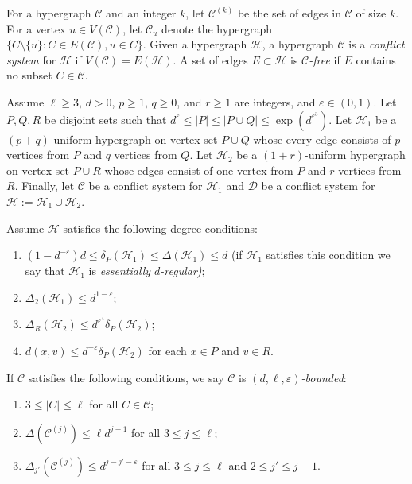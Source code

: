 \documentclass{article}
\theoremstyle{definition}
\newcommand\cH{{\mathcal H}}
\newcommand\cC{{\mathcal C}}
\newcommand{\cD}{\mathcal{D}}
\begin{document}
For a hypergraph $\cC$ and an integer $k$, let $\cC^{(k)}$ be the set of edges in $\cC$ of size $k$.  For a vertex $u \in V(\cC)$, let $\cC_u$ denote the hypergraph $\{C \setminus \{u\} \colon C \in E(\cC), u \in C\}$.  Given a hypergraph $\cH$, a hypergraph $\cC$ is a \emph{conflict system} for $\cH$ if $V(\cC) = E(\cH)$.  A set of edges $E \subset \cH$ is \emph{$\cC$-free} if $E$ contains no subset $C \in \cC$.
 

Assume $\ell \geq 3$, $d > 0$, $p\ge 1$, $q\ge 0$, and $r \geq 1$ are integers, and $\varepsilon \in (0,1)$.  Let $P, Q, R$ be disjoint sets such that $d^\varepsilon \leq |P| \leq |P \cup Q| \leq \exp(d^{\varepsilon^3})$.  Let $\cH_1$ be a $(p+q)$-uniform hypergraph  on vertex set $P\cup Q$ whose every edge consists of $p$ vertices from $P$ and $q$ vertices from $Q$. Let $\cH_2$ be a $(1+r)$-uniform hypergraph on vertex set $P\cup R$ whose edges consist of one vertex from $P$ and $r$ vertices from $R$.  Finally, let $\cC$ be a conflict system for $\cH_1$ and $\cD$ be a conflict system for $\cH := \cH_1 \cup \cH_2$.  

Assume $\cH$ satisfies the following degree conditions:
\begin{enumerate}[label=(H\arabic*)]
    \item \label{H1} $(1 - d^{-\varepsilon}) d \leq \delta_P(\cH_1) \leq \Delta(\cH_1) \leq d$ (if $\cH_1$ satisfies this condition we  say that $\cH_1$ is {\em essentially $d$-regular)};
    \item \label{H2} $\Delta_2(\cH_1) \leq d^{1-\varepsilon}$;
    \item \label{H3} $\Delta_R(\cH_2) \leq d^{\varepsilon^4} \delta_P(\cH_2)$;
    \item \label{H4} $d(x,v) \leq d^{-\varepsilon} \delta_P(\cH_2)$ for each $x \in P$ and $v \in R$.
\end{enumerate}



If $\cC$ satisfies the following  conditions, we say $\cC$ is \emph{$(d, \ell, \varepsilon)$-bounded}:
\begin{enumerate}[label=(C\arabic*)]
    \item \label{C1} $3 \leq |C| \leq \ell$ for all $C \in \cC$;
    \item \label{C2} $\Delta(\cC^{(j)}) \leq \ell d^{j-1}$ for all $3 \leq j \leq \ell$;
    \item \label{C3} $\Delta_{j'}(\cC^{(j)}) \leq d^{j-j'-\varepsilon}$ for all $3 \leq j \leq \ell$ and $2 \leq j' \leq j-1$.   
\end{enumerate}
\end{document}
